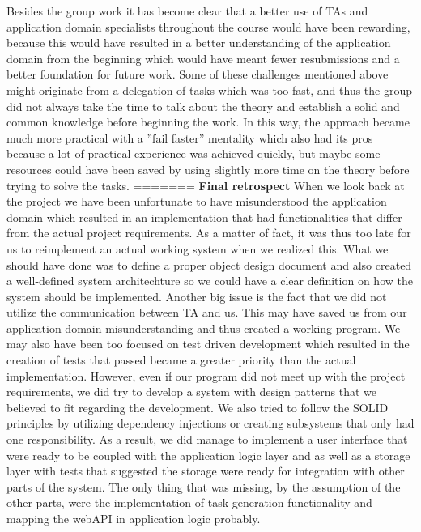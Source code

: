 Besides the group work it has become clear that a better use of TAs and application domain specialists throughout the course would have been rewarding, because this would have resulted in a better understanding of the application domain from the beginning which would have meant fewer resubmissions and a better foundation for future work. 
Some of these challenges mentioned above might originate from a delegation of tasks which was too fast, and thus the group did not always take the time to talk about the theory and establish a solid and common knowledge before beginning the work. In this way, the approach became much more practical with a ''fail faster'' mentality which also had its pros because a lot of practical experience was achieved quickly, but maybe some resources could have been saved by using slightly more time on the theory before trying to solve the tasks.
=======
\textbf{Final retrospect}
When we look back at the project we have been unfortunate to have misunderstood the application domain which resulted in an implementation that had functionalities that differ from the actual project requirements. As a matter of fact, it was thus too late for us to reimplement an actual working system when we realized this. What we should have done was to define a proper object design document and also created a well-defined system architechture so we could have a clear definition on how the system should be implemented. Another big issue is the fact that we did not utilize the communication between TA and us. This may have saved us from our application domain misunderstanding and thus created a working program. We may also have been too focused on test driven development which resulted in the creation of tests that passed became a greater priority than the actual implementation. However, even if our program did not meet up with the project requirements, we did try to develop a system with design patterns that we believed to fit regarding the development. We also tried to follow the SOLID principles by utilizing dependency injections or creating subsystems that only had one responsibility. As a result, we did manage to implement a user interface that were ready to be coupled with the application logic layer and as well as a storage layer with tests that suggested the storage were ready for integration with other parts of the system. The only thing that was missing, by the assumption of the other parts, were the implementation of task generation functionality and mapping the webAPI in application logic probably.